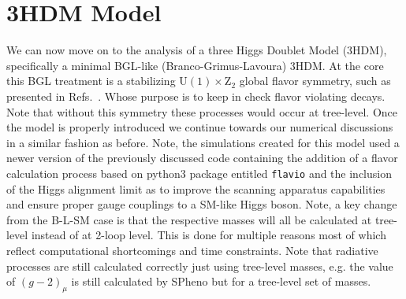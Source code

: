 \documentclass[10pt]{book}
\renewcommand{\(}{\left(}
\renewcommand{\)}{\right)}
\renewcommand{\[}{\left[}
\renewcommand{\]}{\right]}
\begin{document}
%

\renewcommand{\cleardoublepage}{}
\renewcommand{\clearpage}{}

\chapter{3HDM Model}
\label{ch:3HDM}

We can now move on to the analysis of a three Higgs Doublet Model (3HDM), specifically a minimal BGL-like (Branco-Grimus-Lavoura) 3HDM. 
% 
At the core this BGL treatment is a stabilizing $\mathrm{U}(1) \times \mathrm{Z}_2$ global flavor symmetry, such as presented in Refs.~\cite{Ludvig_Thesis,Ian_Thesis}.
%
Whose purpose is to keep in check flavor violating decays. 
%
Note that without this symmetry these processes would occur at tree-level. 
%
Once the model is properly introduced we continue towards our numerical discussions in a similar fashion as before. 
%
Note, the simulations created for this model used a newer version of the previously discussed code containing the addition of a flavor calculation process based on python3 package entitled \texttt{flavio} \cite{straub2018flavio} and the inclusion of the Higgs alignment limit as to improve the scanning apparatus capabilities and ensure proper gauge couplings to a SM-like Higgs boson.
%
%
Note, a key change from the B-L-SM case is that the respective masses will all be calculated at tree-level instead of at 2-loop level. 
%
This is done for multiple reasons most of which reflect computational shortcomings and time constraints.
%
Note that radiative processes are still calculated correctly just using tree-level masses, e.g. the value of $(g-2)_\mu$ is still calculated by SPheno but for a tree-level set of masses.

%
%
%
%
\end{document}
